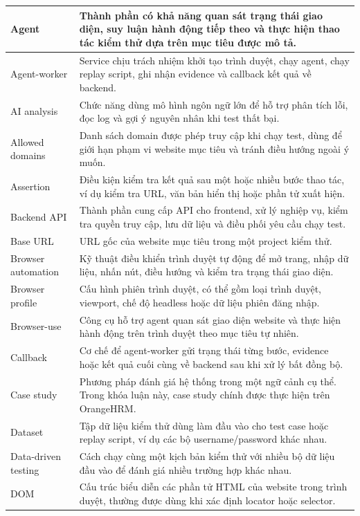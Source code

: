 {\begin{longtable}{|p{4.2cm}|p{10.0cm}|}
Agent & Thành phần có khả năng quan sát trạng thái giao diện, suy luận hành động tiếp theo và thực hiện thao tác kiểm thử dựa trên mục tiêu được mô tả. \\
\hline
Agent-worker & Service chịu trách nhiệm khởi tạo trình duyệt, chạy agent, chạy replay script, ghi nhận evidence và callback kết quả về backend. \\
\hline
AI analysis & Chức năng dùng mô hình ngôn ngữ lớn để hỗ trợ phân tích lỗi, đọc log và gợi ý nguyên nhân khi test thất bại. \\
\hline
Allowed domains & Danh sách domain được phép truy cập khi chạy test, dùng để giới hạn phạm vi website mục tiêu và tránh điều hướng ngoài ý muốn. \\
\hline
Assertion & Điều kiện kiểm tra kết quả sau một hoặc nhiều bước thao tác, ví dụ kiểm tra URL, văn bản hiển thị hoặc phần tử xuất hiện. \\
\hline
Backend API & Thành phần cung cấp API cho frontend, xử lý nghiệp vụ, kiểm tra quyền truy cập, lưu dữ liệu và điều phối yêu cầu chạy test. \\
\hline
Base URL & URL gốc của website mục tiêu trong một project kiểm thử. \\
\hline
Browser automation & Kỹ thuật điều khiển trình duyệt tự động để mở trang, nhập dữ liệu, nhấn nút, điều hướng và kiểm tra trạng thái giao diện. \\
\hline
Browser profile & Cấu hình phiên trình duyệt, có thể gồm loại trình duyệt, viewport, chế độ headless hoặc dữ liệu phiên đăng nhập. \\
\hline
Browser-use & Công cụ hỗ trợ agent quan sát giao diện website và thực hiện hành động trên trình duyệt theo mục tiêu tự nhiên. \\
\hline
Callback & Cơ chế để agent-worker gửi trạng thái từng bước, evidence hoặc kết quả cuối cùng về backend sau khi xử lý bất đồng bộ. \\
\hline
Case study & Phương pháp đánh giá hệ thống trong một ngữ cảnh cụ thể. Trong khóa luận này, case study chính được thực hiện trên OrangeHRM. \\
\hline
Dataset & Tập dữ liệu kiểm thử dùng làm đầu vào cho test case hoặc replay script, ví dụ các bộ username/password khác nhau. \\
\hline
Data-driven testing & Cách chạy cùng một kịch bản kiểm thử với nhiều bộ dữ liệu đầu vào để đánh giá nhiều trường hợp khác nhau. \\
\hline
DOM & Cấu trúc biểu diễn các phần tử HTML của website trong trình duyệt, thường được dùng khi xác định locator hoặc selector. \\

\end{longtable}}
